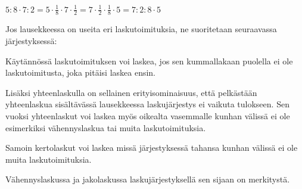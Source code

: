 

\begin{esimerkki}
$5:8\cdot 7:2=5\cdot\frac18\cdot 7\cdot\frac12=7\cdot \frac12\cdot\frac18\cdot 5=7:2:8\cdot 5$
\end{esimerkki} 

Jos lausekkeessa on useita eri laskutoimituksia, ne suoritetaan seuraavassa järjestyksessä:


Käytännössä laskutoimituksen voi laskea, jos sen kummallakaan puolella ei ole laskutoimitusta, joka pitäisi laskea ensin.



Lisäksi yhteenlaskulla on sellainen erityisominaisuus, että pelkästään yhteenlaskua sisältävässä
lausekkeessa laskujärjestys ei vaikuta tulokseen. Sen vuoksi yhteenlaskut voi laskea myös oikealta
vasemmalle kunhan välissä ei ole esimerkiksi vähennyslaskua tai muita laskutoimituksia.

Samoin kertolaskut voi laskea missä järjestyksessä tahansa kunhan välissä ei ole muita laskutoimituksia.

Vähennyslaskussa ja jakolaskussa laskujärjestyksellä sen sijaan on merkitystä.

